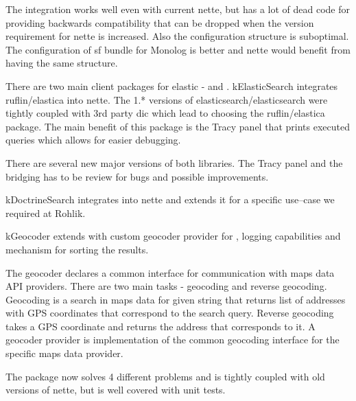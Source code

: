 The integration works well even with current \gls{nette}, but has a lot of dead code for providing backwards compatibility that can be dropped when the version requirement for \gls{nette} is increased. Also the configuration structure is suboptimal. The configuration of \gls{sf} bundle for Monolog is better and \gls{nette} would benefit from having the same structure.

 \label{sec:state:elastic-search}

There are two main client packages for \gls{elastic} -  and . \gls{kElasticSearch} integrates ruflin/elastica into \gls{nette}. The 1.* versions of elasticsearch/elasticsearch were tightly coupled with 3rd party \gls{dic} which lead to choosing the ruflin/elastica package. The main benefit of this package is the Tracy panel that prints executed queries which allows for easier debugging.

There are several new major versions of both libraries. The Tracy panel and the bridging has to be review for bugs and possible improvements.

 \label{sec:state:doctrine-search}

\gls{kDoctrineSearch} integrates  into \gls{nette} and extends it for a specific use--case we required at Rohlik.

 \label{sec:state:geocoder}

\gls{kGeocoder} extends  with custom geocoder provider for , logging capabilities and mechanism for sorting the results.

The geocoder declares a common interface for communication with maps data API providers. There are two main tasks - geocoding and reverse geocoding. Geocoding is a search in maps data for given string that returns list of addresses with GPS coordinates that correspond to the search query. Reverse geocoding takes a GPS coordinate and returns the address that corresponds to it. A geocoder provider is implementation of the common geocoding interface for the specific maps data provider.

The package now solves 4 different problems and is tightly coupled with old versions of \gls{nette}, but is well covered with unit tests.

